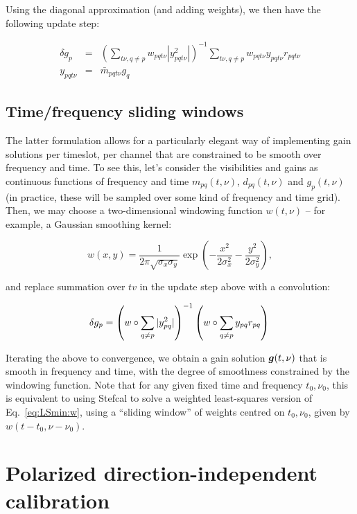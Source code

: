 \documentclass[useAMS,usenatbib]{mn2e}
\begin{document}
Using the diagonal approximation (and adding weights), we then have the following update step:

\begin{eqnarray*}
\label{eq:JHJ:diag:W:tf}
\delta g_p &=& \left( \sum\limits_{t\nu,q\ne p} w_{pqt\nu} |y^2_{pqt\nu}| \right )^{-1} \sum\limits_{t\nu,q\ne p} w_{pqt\nu} y_{pqt\nu} r_{pqt\nu}\\
y_{pqt\nu}&=&\bar{m}_{pqt\nu}g_q \nonumber
\end{eqnarray*}


\subsection{Time/frequency sliding windows}

The latter formulation allows for a particularly elegant way of implementing gain solutions per timeslot, per channel
that are constrained to be smooth over frequency and time. To see this, let's consider the visibilities and gains as
continuous functions of frequency and time $m_{pq}(t,\nu)$, $d_{pq}(t,\nu)$ and $g_p(t,\nu)$ (in practice, these will be sampled over some kind of frequency and time grid). Then, we may choose a two-dimensional windowing function $w(t,\nu)$ -- for example, 
a Gaussian smoothing kernel:

\[
w(x,y) = \frac{1}{2\pi\sqrt{\sigma_x\sigma_y}} \exp\left( -\frac{x^2}{2\sigma^2_x} - \frac{y^2}{2\sigma_y^2} \right),
\]

and replace summation over $tv$ in the update step above with a convolution:

\begin{equation}
\label{eq:JHJ:diag:smooth}
\delta g_p = \left( w\circ\sum\limits_{q\ne p} |y^2_{pq}| \right )^{-1} \left( w\circ \sum\limits_{q\ne p} y_{pq} r_{pq} \right )\\
\end{equation}

Iterating the above to convergence, we obtain a gain solution $\bmath{g}(t,\nu)$ that is smooth in frequency and time, with the degree of smoothness 
constrained by the windowing function. Note that for any given fixed time and frequency $t_0,\nu_0$, this is equivalent to using Stefcal to solve a weighted least-squares version of Eq.~\ref{eq:LSmin:w}, using a ``sliding window'' of weights centred on $t_0,\nu_0$, given by $w(t-t_0,\nu-\nu_0)$.

\section{Polarized direction-independent calibration}
\end{document}
